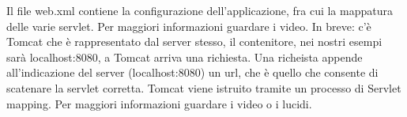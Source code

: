 Il file web.xml contiene la configurazione dell'applicazione, fra cui la mappatura delle varie servlet. Per maggiori informazioni guardare i video. In breve: c'è Tomcat che è rappresentato dal server stesso, il contenitore, nei nostri esempi sarà localhost:8080, a Tomcat arriva una richiesta. Una richeista appende all'indicazione del server (localhost:8080) un url, che è quello che consente di scatenare la servlet corretta. Tomcat viene istruito tramite un processo di Servlet mapping. Per maggiori informazioni guardare i video o i lucidi.\newline
